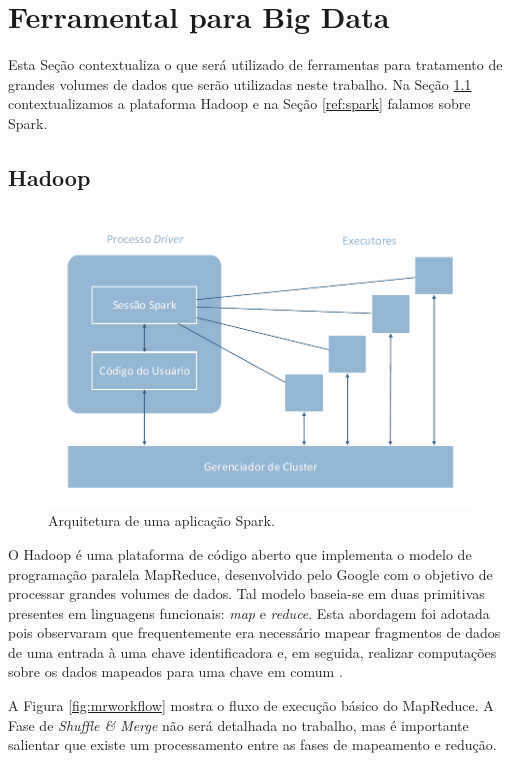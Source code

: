 \section{Ferramental para Big Data}

Esta Seção contextualiza o que será utilizado de ferramentas para 
tratamento de grandes volumes de dados que serão utilizadas neste trabalho. Na 
Seção \ref{ref:hadoop} contextualizamos a plataforma Hadoop e na Seção 
\ref{ref:spark} falamos sobre Spark.

\subsection{Hadoop} \label{ref:hadoop}


\begin{figure}[H]
 \centerline{\includegraphics[width=1\textwidth]{./img/spark-arch.pdf}}
 \caption{Arquitetura de uma aplicação Spark.}
 \label{fig:spark-arch}
\end{figure}

O Hadoop é uma plataforma de código aberto que implementa o modelo de 
programação paralela MapReduce, desenvolvido pelo Google com o objetivo de 
processar grandes volumes de dados. Tal modelo baseia-se em duas primitivas 
presentes em linguagens funcionais: \emph{map} e \emph{reduce}. Esta abordagem 
foi adotada pois observaram que frequentemente era necessário mapear fragmentos 
de dados de uma entrada à uma chave identificadora e, em seguida, realizar 
computações sobre os dados mapeados para uma chave em comum 
\cite{ref:mapreduce}.

A Figura \ref{fig:mrworkflow} mostra o fluxo de execução básico do MapReduce. 
A Fase de \emph{Shuffle \& Merge} não será detalhada no trabalho, mas é 
importante salientar que existe um processamento entre as fases de mapeamento e 
redução.

